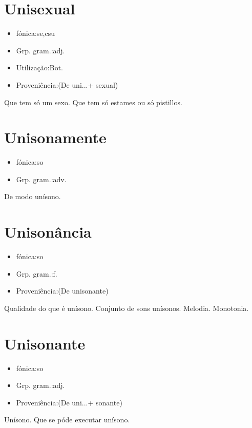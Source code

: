 \documentclass{article}
\begin{document}
\section{Unisexual}
\begin{itemize}
\item {fónica:se,csu}
\end{itemize}
\begin{itemize}
\item {Grp. gram.:adj.}
\end{itemize}
\begin{itemize}
\item {Utilização:Bot.}
\end{itemize}
\begin{itemize}
\item {Proveniência:(De \textunderscore uni...\textunderscore  + \textunderscore sexual\textunderscore )}
\end{itemize}
Que tem só um sexo.
Que tem só estames ou só pistillos.
\section{Unisonamente}
\begin{itemize}
\item {fónica:so}
\end{itemize}
\begin{itemize}
\item {Grp. gram.:adv.}
\end{itemize}
De modo unísono.
\section{Unisonância}
\begin{itemize}
\item {fónica:so}
\end{itemize}
\begin{itemize}
\item {Grp. gram.:f.}
\end{itemize}
\begin{itemize}
\item {Proveniência:(De \textunderscore unisonante\textunderscore )}
\end{itemize}
Qualidade do que é unísono.
Conjunto de sons unísonos.
Melodia.
Monotonia.
\section{Unisonante}
\begin{itemize}
\item {fónica:so}
\end{itemize}
\begin{itemize}
\item {Grp. gram.:adj.}
\end{itemize}
\begin{itemize}
\item {Proveniência:(De \textunderscore uni...\textunderscore  + \textunderscore sonante\textunderscore )}
\end{itemize}
Unísono.
Que se póde executar unísono.
\end{document}
